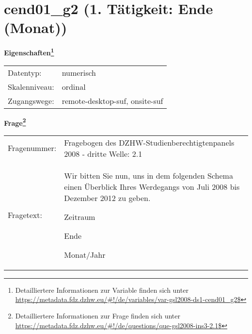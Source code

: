 
    \setcounter{footnote}{0}

    \vspace*{-1.8cm}
	\section{cend01\_g2 (1. Tätigkeit: Ende (Monat))}
	\label{section:cend01_g2}



    \vspace*{0.5cm}
    \noindent\textbf{Eigenschaften\footnote{Detailliertere Informationen zur Variable finden sich unter
		\url{https://metadata.fdz.dzhw.eu/\#!/de/variables/var-gsl2008-ds1-cend01_g2$}}}\\
	\begin{tabularx}{\hsize}{@{}lX}
	Datentyp: & numerisch \\
	Skalenniveau: & ordinal \\
	Zugangswege: &
	  remote-desktop-suf, 
	  onsite-suf
 \\
    \end{tabularx}



				\vspace*{0.5cm}
                \noindent\textbf{Frage\footnote{Detailliertere Informationen zur Frage finden sich unter
		              \url{https://metadata.fdz.dzhw.eu/\#!/de/questions/que-gsl2008-ins3-2.1$}}}\\
				\begin{tabularx}{\hsize}{@{}lX}
					Fragenummer: &
					  Fragebogen des DZHW-Studienberechtigtenpanels 2008 - dritte Welle:
					  2.1
 \\
					Fragetext: & Wir bitten Sie nun, uns in dem folgenden Schema einen Überblick Ihres Werdegangs von Juli 2008 bis Dezember 2012 zu geben.\par  Zeitraum\par  Ende\par  Monat/Jahr \\
				\end{tabularx}






